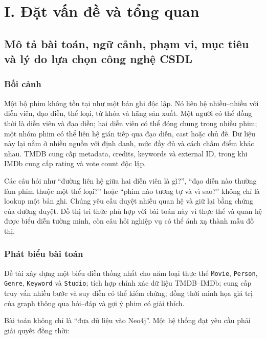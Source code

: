 \chapter{I. Đặt vấn đề và tổng quan}

\section{Mô tả bài toán, ngữ cảnh, phạm vi, mục tiêu và lý do lựa chọn công nghệ CSDL}

\subsection{Bối cảnh}

Một bộ phim không tồn tại như một bản ghi độc lập. Nó liên hệ nhiều–nhiều với
diễn viên, đạo diễn, thể loại, từ khóa và hãng sản xuất. Một người có thể đồng
thời là diễn viên và đạo diễn; hai diễn viên có thể đóng chung trong nhiều phim;
một nhóm phim có thể liên hệ gián tiếp qua đạo diễn, cast hoặc chủ đề. Dữ liệu
này lại nằm ở nhiều nguồn với định danh, mức đầy đủ và cách chấm điểm khác nhau.
TMDB cung cấp metadata, credits, keywords và external ID, trong khi IMDb cung cấp
rating và vote count độc lập.

Các câu hỏi như “đường liên hệ giữa hai diễn viên là gì?”, “đạo diễn nào thường
làm phim thuộc một thể loại?” hoặc “phim nào tương tự và vì sao?” không chỉ là
lookup một bản ghi. Chúng yêu cầu duyệt nhiều quan hệ và giữ lại bằng chứng của
đường duyệt. Đồ thị tri thức phù hợp với bài toán này vì thực thể và quan hệ được
biểu diễn tường minh, còn câu hỏi nghiệp vụ có thể ánh xạ thành mẫu đồ thị.

\subsection{Phát biểu bài toán}

Đề tài xây dựng một biểu diễn thống nhất cho năm loại thực thể \texttt{Movie}, \texttt{Person},
\texttt{Genre}, \texttt{Keyword} và \texttt{Studio}; tích hợp chính xác dữ liệu TMDB–IMDb; cung cấp
truy vấn nhiều bước và suy diễn có thể kiểm chứng; đồng thời minh họa giá trị của
graph thông qua hỏi–đáp và gợi ý phim có giải thích.

Bài toán không chỉ là “đưa dữ liệu vào Neo4j”. Một hệ thống đạt yêu cầu phải giải
quyết đồng thời:


